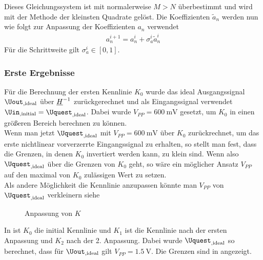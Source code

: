 \documentclass[../Report.tex]{subfiles}
\begin{document}
Dieses Gleichungssystem ist mit normalerweise $M>N$ überbestimmt und wird mit der Methode der kleinsten Quadrate gelöst. Die Koeffizienten $\tilde{a}_n$ werden nun wie folgt zur Anpassung der Koeffizienten $a_n$ verwendet
\begin{align}
	\label{eq:opt.adjusta}
	a_n^{i+1} = a_n^{i} + \sigma_{a}^{i} \tilde{a}_n^{i}
\end{align}
Für die Schrittweite gilt $\sigma_{a}^i \in \left[ 0 , 1 \right]$.

\subsubsection*{Erste Ergebnisse}
\label{subsubsec:opt.adjusta.results}
Für die Berechnung der ersten Kennlinie $K_0$ wurde das ideal Ausgangssignal $\Uout_{, \mathrm{ideal}}$ über $\underline{H}^{-1}$ zurückgerechnet und als Eingangssignal verwendet $\Uin_{, \mathrm{initial }} = \Uquest_{, \mathrm{ideal}}$. Dabei wurde $V_{PP} = \SI{600}{\mV}$ gesetzt, um $K_0$ in einen größeren Bereich berechnen zu können.\\
Wenn man jetzt $\Uquest_{, \mathrm{ideal}}$ mit $V_{PP} = \SI{600}{\mV}$ über $K_0$ zurückrechnet, um das erste nichtlinear vorverzerrte Eingangssignal zu erhalten, so stellt man fest, dass die Grenzen, in denen $K_0$ invertiert werden kann, zu klein sind. Wenn also $\Uquest_{, \mathrm{ideal}}$ über die Grenzen von $K_0$ geht, so wäre ein möglicher Ansatz $V_{PP}$ auf den maximal von $K_0$ zulässigen Wert zu setzen.\\
Als andere Möglichkeit die Kennlinie anzupassen könnte man $V_{PP}$ von $\Uquest_{, \mathrm{ideal}}$ verkleinern siehe 
\begin{figure}[H]
\begin{subfigure}{0.5 \textwidth}
    \newlength\figureheight
	\newlength\figurewidth
	\setlength\figureheight{8cm}
	\setlength\figurewidth{8cm}
	\label{fig:K}
\end{subfigure}
\begin{subfigure}{0.5 \textwidth}
	\setlength\figureheight{8cm}
	\setlength\figurewidth{8cm}
	\label{fig:Uout}
\end{subfigure}
\label{fig:opt.Kennlinie}
\caption{Anpassung von $K$}
\end{figure}
In  ist $K_0$ die initial Kennlinie und $K_1$ ist die Kennlinie nach der ersten Anpassung und $K_2$ nach der 2. Anpassung. Dabei wurde $\Uquest_{, \mathrm{ideal}}$ so berechnet, dass für $\Uout_{, \mathrm{ideal}}$ gilt $V_{PP} = \SI{1,5}{\V}$. Die Grenzen sind in  angezeigt.
\end{document}
